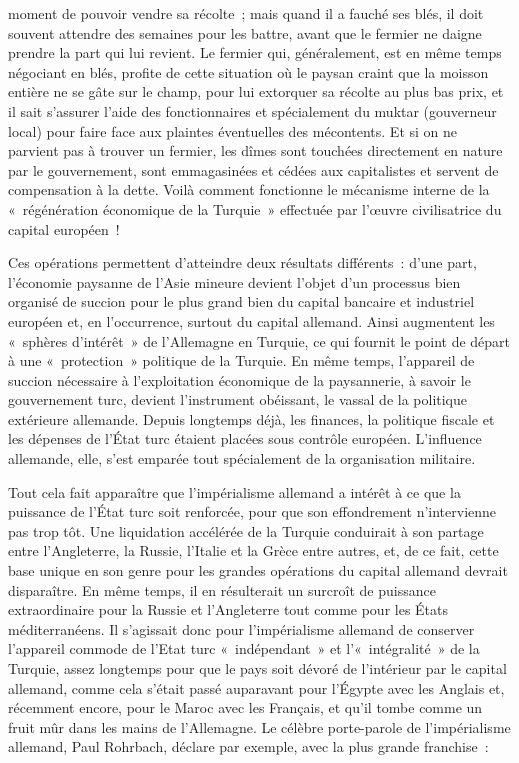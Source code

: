\documentclass[french,twoside]{book} %
\begin{document}
moment de pouvoir vendre sa récolte ; mais quand il a fauché ses blés, il doit souvent attendre des semaines pour les battre, avant que le fermier ne daigne prendre la part qui lui revient. Le fermier qui, généralement, est en même temps négociant en blés, profite de cette situation où le paysan craint que la moisson entière ne se gâte sur le champ, pour lui extorquer sa récolte au plus bas prix, et il  sait s’assurer l’aide des fonctionnaires et spécialement du muktar (gouverneur local) pour faire face aux plaintes éventuelles des mécontents. Et si on ne parvient pas à trouver un fermier, les dîmes sont touchées directement en nature par le gouvernement, sont emmagasinées et cédées aux capitalistes et servent de compensation à la dette. Voilà comment fonctionne le mécanisme interne de la « régénération économique de la Turquie » effectuée par l’œuvre civilisatrice du capital européen !\par
Ces opérations permettent d’atteindre deux résultats différents : d’une part, l’économie paysanne de l’Asie mineure devient l’objet d’un processus bien organisé de succion pour le plus grand bien du capital bancaire et industriel européen et, en l’occurrence, surtout du capital allemand. Ainsi augmentent les « sphères d’intérêt » de l’Allemagne en Turquie, ce qui fournit le point de départ à une « protection » politique de la Turquie. En même temps, l’appareil de succion nécessaire à l’exploitation économique de la paysannerie, à savoir le gouvernement turc, devient l’instrument obéissant, le vassal de la politique extérieure allemande. Depuis longtemps déjà, les finances, la politique fiscale et les dépenses de l’État turc étaient placées sous contrôle européen. L'influence allemande, elle, s’est emparée tout spécialement de la organisation militaire.\par
Tout cela fait apparaître que l’impérialisme allemand a intérêt à ce que la puissance de l’État turc soit renforcée, pour que son effondrement n’intervienne pas trop tôt. Une liquidation accélérée de la Turquie conduirait à son partage entre l’Angleterre, la Russie, l’Italie et la Grèce entre autres, et, de ce fait, cette base unique en son genre pour les grandes opérations du capital allemand devrait disparaître. En même temps, il en résulterait un surcroît de puissance extraordinaire pour la Russie et l’Angleterre tout comme pour les États méditerranéens. Il s’agissait donc pour l’impérialisme allemand de conserver l’appareil commode de l’Etat turc « indépendant » et l’« intégralité » de la Turquie, assez longtemps pour que le pays soit dévoré de l’intérieur par le capital allemand, comme cela s’était passé auparavant pour l’Égypte avec les Anglais et, récemment encore, pour le Maroc avec les Français, et qu’il tombe comme un fruit mûr dans les mains de l’Allemagne. Le célèbre porte-parole de l’impérialisme allemand, Paul Rohrbach, déclare par exemple, avec la plus grande franchise :\par
\end{document}
